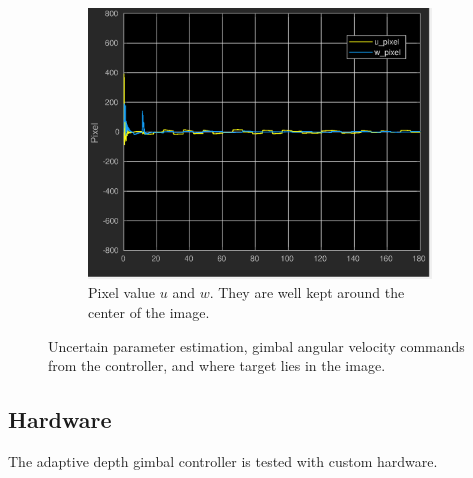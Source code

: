 \begin{figure}[htbp]
\begin{subfigure}{0.5\textwidth}
		\includegraphics[width=0.9\linewidth]{images/chapter2/uav_pixel}
		\caption{Pixel value $u$ and $w$. They are well kept around the center of the image.}
	\end{subfigure}	
	\caption{Uncertain parameter estimation, gimbal angular velocity commands from the controller, and where target lies in the image.}
	\label{uav_adaptive_additional}
\end{figure}

\subsection{Hardware}
The adaptive depth gimbal controller is tested with custom hardware. 